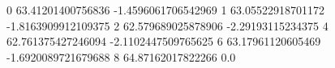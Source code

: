 0 63.41201400756836 -1.4596061706542969
1 63.05522918701172 -1.8163909912109375
2 62.579689025878906 -2.29193115234375
4 62.761375427246094 -2.1102447509765625
6 63.17961120605469 -1.6920089721679688
8 64.87162017822266 0.0
